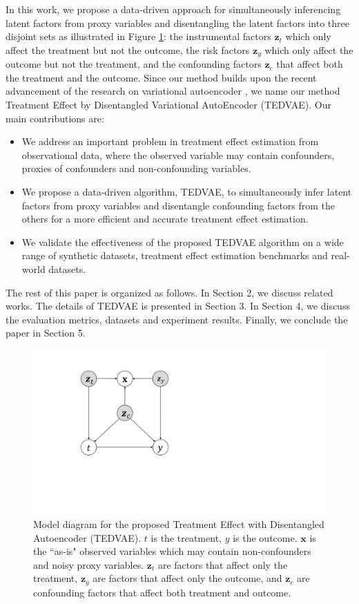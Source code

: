 \documentclass[letterpaper]{article} %
\begin{document}
In this work, we propose a data-driven approach for simultaneously inferencing latent factors from proxy variables and disentangling the latent factors into three disjoint sets as illustrated in Figure \ref{illustration}: the instrumental factors $\mathbf{z}_t$ which only affect the treatment but not the outcome, the risk factors $\mathbf{z}_y$ which only affect the outcome but not the treatment, and the confounding factors $\mathbf{z}_c$ that affect both the treatment and the outcome.
Since our method builds upon the recent advancement of the research on variational autoencoder \cite{Kingma2014}, we name our method Treatment Effect by Disentangled Variational AutoEncoder (TEDVAE).
Our main contributions are:
\begin{itemize}
\item We address an important problem in treatment effect estimation from observational data, where the observed variable may contain confounders, proxies of confounders and non-confounding variables.
\item We propose a data-driven algorithm, TEDVAE, to simultaneously infer latent factors from proxy variables and disentangle confounding factors from the others for a more efficient and accurate treatment effect estimation.
\item We validate the effectiveness of the proposed TEDVAE algorithm on a wide range of synthetic datasets, treatment effect estimation benchmarks and real-world datasets.
\end{itemize}

The rest of this paper is organized as follows. In Section 2, we discuss related works. The details of TEDVAE is presented in Section 3. In Section 4, we discuss the evaluation metrics, datasets and experiment results. Finally, we conclude the paper in Section 5.


\begin{figure}[!t]
\centering
\includegraphics[width = 0.9\columnwidth]{figures.pdf}
\caption{Model diagram for the proposed Treatment Effect with Disentangled Autoencoder (TEDVAE). $t$ is the treatment, $y$ is the outcome. $\mathbf{x}$ is the ``as-is" observed variables which may contain non-confounders and noisy proxy variables.
$\mathbf{z}_t$ are factors that affect only the treatment, $\mathbf{z}_y$ are factors that affect only the outcome, and $\mathbf{z}_c$ are confounding factors that affect both treatment and outcome.
}
\label{illustration}
\end{figure}
\end{document}
